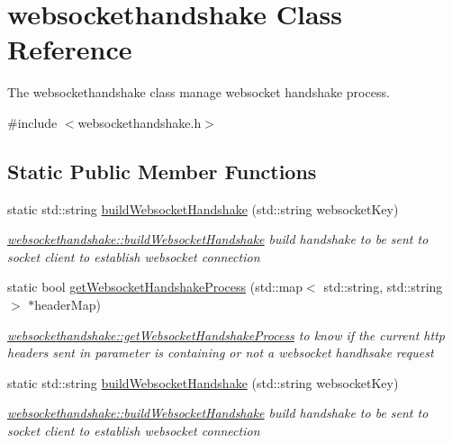 \hypertarget{classwebsockethandshake}{\section{websockethandshake Class Reference}
\label{classwebsockethandshake}
}


The websockethandshake class manage websocket handshake process.  




{\ttfamily \#include $<$websockethandshake.\-h$>$}

\subsection*{Static Public Member Functions}
\begin{DoxyCompactItemize}
\item 
static std\-::string \hyperlink{classwebsockethandshake_a282eeca630dfd409c6b2bc085798071a}{build\-Websocket\-Handshake} (std\-::string websocket\-Key)
\begin{DoxyCompactList}\small\item\em \hyperlink{classwebsockethandshake_a282eeca630dfd409c6b2bc085798071a}{websockethandshake\-::build\-Websocket\-Handshake} build handshake to be sent to socket client to establish websocket connection \end{DoxyCompactList}\item 
static bool \hyperlink{classwebsockethandshake_aff8fb10a4f3db3fd3452faf4923d3742}{get\-Websocket\-Handshake\-Process} (std\-::map$<$ std\-::string, std\-::string $>$ $\ast$header\-Map)
\begin{DoxyCompactList}\small\item\em \hyperlink{classwebsockethandshake_aff8fb10a4f3db3fd3452faf4923d3742}{websockethandshake\-::get\-Websocket\-Handshake\-Process} to know if the current http headers sent in parameter is containing or not a websocket handhsake request \end{DoxyCompactList}\item 
static std\-::string \hyperlink{classwebsockethandshake_af30dbf9a3c72d3aeb09a7268cfa18414}{build\-Websocket\-Handshake} (std\-::string websocket\-Key)
\begin{DoxyCompactList}\small\item\em \hyperlink{classwebsockethandshake_a282eeca630dfd409c6b2bc085798071a}{websockethandshake\-::build\-Websocket\-Handshake} build handshake to be sent to socket client to establish websocket connection \end{DoxyCompactList}\item 

\end{DoxyCompactItemize}
